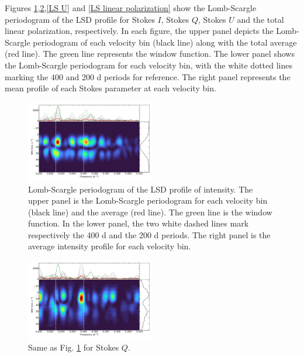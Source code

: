 \documentclass{aa}
\begin{document}
Figures \ref{LS intensity},\ref{LS Q},\ref{LS U} and \ref{LS linear polarization} show the Lomb-Scargle periodogram of the LSD profile for Stokes $I$, Stokes $Q$, Stokes $U$ and the total linear polarization, respectively. 
In each figure, the upper panel depicts the Lomb-Scargle periodogram of each velocity bin (black line) along with the total average (red line). The green line represents the window function. The lower panel shows the Lomb-Scargle periodogram for each velocity bin, with the white dotted lines marking the 400 and 200 d periods for reference. The right panel represents the mean profile of each Stokes parameter at each velocity bin.

\begin{figure}[!h]
    \centering
    \includegraphics[width=0.5\textwidth]{Lomb-Scargle Intensity.pdf}
    \caption{Lomb-Scargle periodogram of the LSD profile of intensity.
    The upper panel is the Lomb-Scargle periodogram for each velocity bin (black line) and the average (red line). The green line is the window function.
    In the lower panel, the two white dashed lines mark respectively the 400 d and the 200 d periods. The right panel is the average intensity profile for each velocity bin.}
    \label{LS intensity}
\end{figure}

\begin{figure}[!h]
    \centering
    \includegraphics[width=0.5\textwidth]{Lomb-Scargle Stokes Q.pdf}
    \caption{Same as Fig. \ref{LS intensity} for Stokes $Q$. }
    \label{LS Q}
\end{figure}
\end{document}
